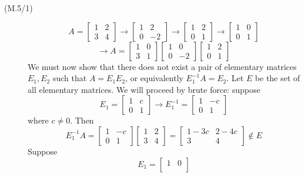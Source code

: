 \begin{description}
\item[(M.5/1)]
$$A = \begin{bmatrix}
1 & 2 \\
3 & 4
\end{bmatrix} \rightarrow \begin{bmatrix}
1 & 2 \\
0 & -2
\end{bmatrix} \rightarrow \begin{bmatrix}
1 & 2 \\
0 & 1
\end{bmatrix} \rightarrow \begin{bmatrix}
1 & 0 \\
0 & 1
\end{bmatrix}$$
$$\rightarrow A = \begin{bmatrix}
1 & 0 \\
3 & 1
\end{bmatrix}\begin{bmatrix}
1 & 0 \\
0 & -2
\end{bmatrix}\begin{bmatrix}
1 & 2 \\
0 & 1
\end{bmatrix}$$
We must now show that there does not exist a pair of elementary matrices $E_1, E_2$ such that $A = E_1E_2$, or equivalently $E_1^{-1}A = E_2$. Let $E$ be the set of all elementary matrices. We will proceed by brute force: suppose 
$$E_1 = \begin{bmatrix}
1 & c \\
0 & 1
\end{bmatrix} \rightarrow E_1^{-1} = \begin{bmatrix}
1 & -c \\
0 & 1
\end{bmatrix}$$
where $c \neq 0$. Then
$$E_1^{-1}A = \begin{bmatrix}
1 & -c \\
0 & 1
\end{bmatrix}\begin{bmatrix}
1 & 2 \\
3 & 4
\end{bmatrix} = \begin{bmatrix}
1 - 3c & 2 - 4c \\
3 & 4
\end{bmatrix} \not \in E$$
Suppose
$$E_1 = \begin{bmatrix}
1 & 0 \\

\end{bmatrix}$$
\end{description}
